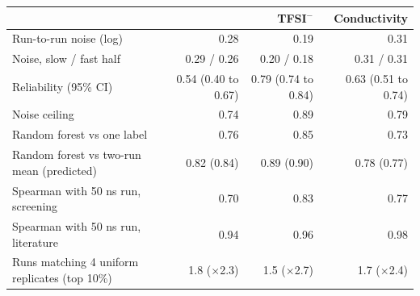 \begin{tabular}{lrrr}
\toprule
 & \Li{} & TFSI$^-$ & Conductivity \\
\midrule
Run-to-run noise (log) & 0.28 & 0.19 & 0.31 \\
Noise, slow / fast half & 0.29 / 0.26 & 0.20 / 0.18 & 0.31 / 0.31 \\
Reliability (95\% CI) & 0.54 (0.40 to 0.67) & 0.79 (0.74 to 0.84) & 0.63 (0.51 to 0.74) \\
Noise ceiling & 0.74 & 0.89 & 0.79 \\
Random forest vs one label & 0.76 & 0.85 & 0.73 \\
Random forest vs two-run mean (predicted) & 0.82 (0.84) & 0.89 (0.90) & 0.78 (0.77) \\
Spearman with 50 ns run, screening & 0.70 & 0.83 & 0.77 \\
Spearman with 50 ns run, literature & 0.94 & 0.96 & 0.98 \\
Runs matching 4 uniform replicates (top 10\%) & 1.8 ($\times$2.3) & 1.5 ($\times$2.7) & 1.7 ($\times$2.4) \\
\bottomrule
\end{tabular}
